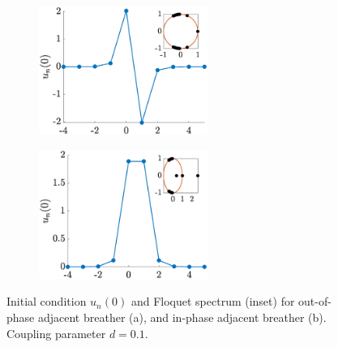 \documentclass[12pt,reqno]{amsart}
\theoremstyle{definition}
\begin{document}
\begin{figure}
	\begin{center}
	\begin{subfigure}{0.3\linewidth}
		\caption{}
		\includegraphics[width=5.5cm]{SGintersitepm.eps} \hspace{-0.5cm}
		\label{fig:SGintersitea} 
	\end{subfigure}
	\begin{subfigure}{0.3\linewidth}
		\caption{}
		\includegraphics[width=5.5cm]{SGintersitepp.eps} \hspace{-0.5cm}
		\label{fig:SGintersiteb} 
	\end{subfigure}
	\end{center}
	\caption{Initial condition $u_n(0)$ and Floquet spectrum (inset) for out-of-phase adjacent breather (a), and in-phase adjacent breather (b). Coupling parameter $d=0.1$. }
	\label{fig:SGintersite}
\end{figure}
\end{document}
